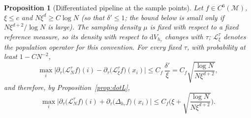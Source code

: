 \documentclass[11pt,a4paper]{article}
\theoremstyle{stmt}
\newtheorem{proposition}[theorem]{Proposition}
\theoremstyle{defn}
\theoremstyle{rmk}
\numberwithin{equation}{section}
\newcommand{\M}{\mathcal{M}}
\newcommand{\Lc}{\mathcal{L}}
\newcommand{\dd}{\mathrm{d}}
\begin{document}
{\begin{proposition}[Differentiated pipeline at the sample points]\label{prop:dotLN}
Let $f\in C^6(\M)$, $\xi\le c$ and $N\xi^{d}\ge C\log N$ (so that $\delta'\le1$; the bound below is small only if $N\xi^{d+2}/\log N$ is large). The sampling density $\mu$ is fixed with respect to a fixed reference measure, so its density with respect to $\dd V_{h_\tau}$ changes with $\tau$; $\Lc^\tau_\xi$ denotes the population operator for this convention. For every fixed $\tau$, with probability at least $1-CN^{-2}$,
\[
\max_i\Big|\partial_\tau\big(\Lc^\tau_Nf\big)(i)-\partial_\tau\big(\Lc^\tau_\xi f\big)(x_i)\Big|\le C_f\,\frac{\delta'}{\xi}=C_f\sqrt{\frac{\log N}{N\xi^{d+2}}},
\]
and therefore, by Proposition~\ref{prop:dotL},
\[
\max_i\Big|\partial_\tau\big(\Lc^\tau_Nf\big)(i)+\partial_\tau\big(\Delta_{h_\tau}f\big)(x_i)\Big|\le C_f\Big(\xi+\sqrt{\frac{\log N}{N\xi^{d+2}}}\Big).
\]
\end{proposition}

}
\end{document}

